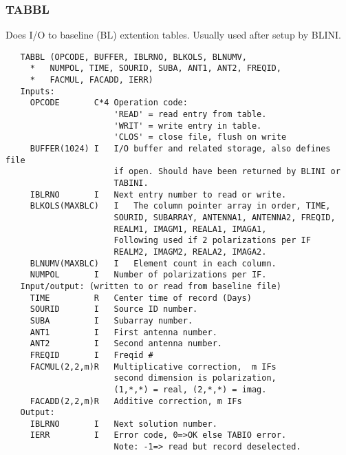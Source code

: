 \subsubsection{TABBL}
Does I/O to baseline (BL) extention tables. Usually used after
setup by BLINI.
\begin{verbatim}
   TABBL (OPCODE, BUFFER, IBLRNO, BLKOLS, BLNUMV,
     *   NUMPOL, TIME, SOURID, SUBA, ANT1, ANT2, FREQID,
     *   FACMUL, FACADD, IERR)
   Inputs:
     OPCODE       C*4 Operation code:
                      'READ' = read entry from table.
                      'WRIT' = write entry in table.
                      'CLOS' = close file, flush on write
     BUFFER(1024) I   I/O buffer and related storage, also defines file
                      if open. Should have been returned by BLINI or
                      TABINI.
     IBLRNO       I   Next entry number to read or write.
     BLKOLS(MAXBLC)   I   The column pointer array in order, TIME,
                      SOURID, SUBARRAY, ANTENNA1, ANTENNA2, FREQID,
                      REALM1, IMAGM1, REALA1, IMAGA1,
                      Following used if 2 polarizations per IF
                      REALM2, IMAGM2, REALA2, IMAGA2.
     BLNUMV(MAXBLC)   I   Element count in each column.
     NUMPOL       I   Number of polarizations per IF.
   Input/output: (written to or read from baseline file)
     TIME         R   Center time of record (Days)
     SOURID       I   Source ID number.
     SUBA         I   Subarray number.
     ANT1         I   First antenna number.
     ANT2         I   Second antenna number.
     FREQID       I   Freqid #
     FACMUL(2,2,m)R   Multiplicative correction,  m IFs
                      second dimension is polarization,
                      (1,*,*) = real, (2,*,*) = imag.
     FACADD(2,2,m)R   Additive correction, m IFs
   Output:
     IBLRNO       I   Next solution number.
     IERR         I   Error code, 0=>OK else TABIO error.
                      Note: -1=> read but record deselected.
\end{verbatim}

